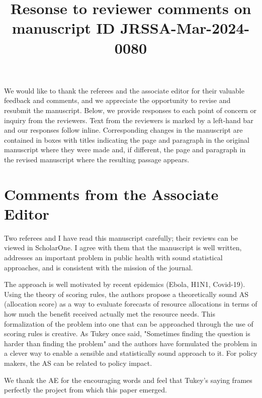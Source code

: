 \documentclass{article}
\author{}
\title{Resonse to reviewer comments on \\ manuscript ID JRSSA-Mar-2024-0080}
\begin{document}
\newcommand{\del}[2]{\frac{\partial {#1} }{\partial {#2}} }
\newcommand{\dby}[2]{\frac{d {#1} }{d {#2}} }
\newcommand{\sbar}{\overline{s}}
\newtheorem{proposition}{Proposition}

\theoremstyle{remark}
\newtheorem*{remark}{Remark}

\maketitle

We would like to thank the referees and the associate editor for their valuable feedback and comments, and we appreciate the opportunity 
to revise and resubmit the manuscript.  Below, we provide responses to each point of concern or inquiry from the reviewers.
Text from the reviewers is marked by a left-hand bar and our responses follow inline.  Corresponding changes in the manuscript are contained
in boxes with titles indicating the page and paragraph in the original manuscript where they were made and, if different, the page 
and paragraph in the revised manuscript where the resulting passage appears.

\section*{Comments from the Associate Editor}

\begin{quotebar}
Two referees and I have read this manuscript carefully; their reviews
can be viewed in ScholarOne.  I agree with them that the manuscript is
well written, addresses an important problem in public health with sound
statistical approaches, and is consistent with the mission of the journal.

The approach is well motivated by recent epidemics (Ebola, H1N1, Covid-19).
Using the theory of scoring rules, the authors propose a theoretically
sound AS (allocation score) as a way to evaluate forecasts of resource
allocations in terms of how much the benefit received actually met the
resource needs.  This formalization of the problem into one that can be
approached through the use of scoring rules is creative. As Tukey once
said, "Sometimes finding the question is harder than finding the problem"
and the authors have formulated the problem in a clever way to enable a
sensible and statistically sound approach to it. For policy makers,
the AS can be related to policy impact.
\end{quotebar}

We thank the AE for the encouraging words and feel that Tukey's saying frames perfectly
the project from which this paper emerged.
\end{document}
